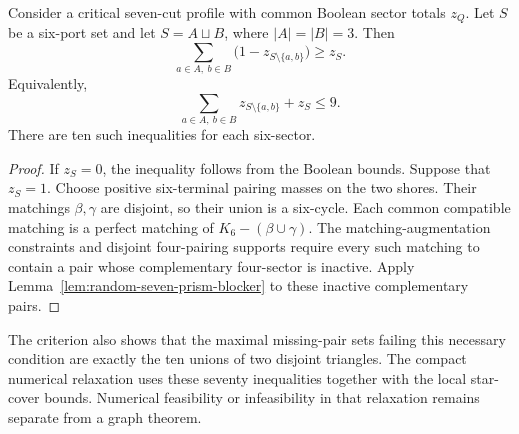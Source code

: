 \begin{corollary}
\label{cor:random-seven-balanced-prism}
Consider a critical seven-cut profile with common Boolean sector totals $z_Q$.
Let $S$ be a six-port set and let $S=A\sqcup B$, where $|A|=|B|=3$.
Then
\[
 \sum_{a\in A,\ b\in B}\bigl(1-z_{S\setminus\{a,b\}}\bigr)
 \ge z_S.
\]
Equivalently,
\[
 \sum_{a\in A,\ b\in B}z_{S\setminus\{a,b\}}+z_S\le9.
\]
There are ten such inequalities for each six-sector.
\end{corollary}

\begin{proof}
If $z_S=0$, the inequality follows from the Boolean bounds.
Suppose that $z_S=1$.
Choose positive six-terminal pairing masses on the two shores.
Their matchings $\beta,\gamma$ are disjoint, so their union is a six-cycle.
Each common compatible matching is a perfect matching of $K_6-(\beta\cup\gamma)$.
The matching-augmentation constraints and disjoint four-pairing supports require every such matching to contain a pair whose complementary four-sector is inactive.
Apply Lemma~\ref{lem:random-seven-prism-blocker} to these inactive complementary pairs.
\end{proof}

The criterion also shows that the maximal missing-pair sets failing this necessary condition are exactly the ten unions of two disjoint triangles.
The compact numerical relaxation uses these seventy inequalities together with the local star-cover bounds.
Numerical feasibility or infeasibility in that relaxation remains separate from a graph theorem.
